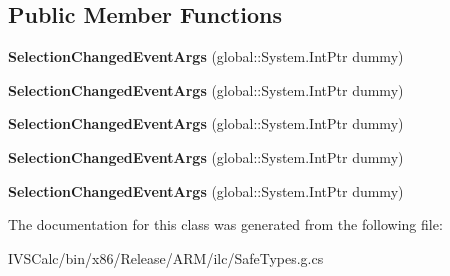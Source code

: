 \subsection*{Public Member Functions}
\begin{DoxyCompactItemize}
\item 
\mbox{\label{class_windows_1_1_u_i_1_1_xaml_1_1_controls_1_1_selection_changed_event_args_a433044296c14c6a2fb55277d5ee798da}} 
{\bfseries Selection\+Changed\+Event\+Args} (global\+::\+System.\+Int\+Ptr dummy)
\item 
\mbox{\label{class_windows_1_1_u_i_1_1_xaml_1_1_controls_1_1_selection_changed_event_args_a433044296c14c6a2fb55277d5ee798da}} 
{\bfseries Selection\+Changed\+Event\+Args} (global\+::\+System.\+Int\+Ptr dummy)
\item 
\mbox{\label{class_windows_1_1_u_i_1_1_xaml_1_1_controls_1_1_selection_changed_event_args_a433044296c14c6a2fb55277d5ee798da}} 
{\bfseries Selection\+Changed\+Event\+Args} (global\+::\+System.\+Int\+Ptr dummy)
\item 
\mbox{\label{class_windows_1_1_u_i_1_1_xaml_1_1_controls_1_1_selection_changed_event_args_a433044296c14c6a2fb55277d5ee798da}} 
{\bfseries Selection\+Changed\+Event\+Args} (global\+::\+System.\+Int\+Ptr dummy)
\item 
\mbox{\label{class_windows_1_1_u_i_1_1_xaml_1_1_controls_1_1_selection_changed_event_args_a433044296c14c6a2fb55277d5ee798da}} 
{\bfseries Selection\+Changed\+Event\+Args} (global\+::\+System.\+Int\+Ptr dummy)
\end{DoxyCompactItemize}


The documentation for this class was generated from the following file\+:\begin{DoxyCompactItemize}
\item 
I\+V\+S\+Calc/bin/x86/\+Release/\+A\+R\+M/ilc/Safe\+Types.\+g.\+cs\end{DoxyCompactItemize}
